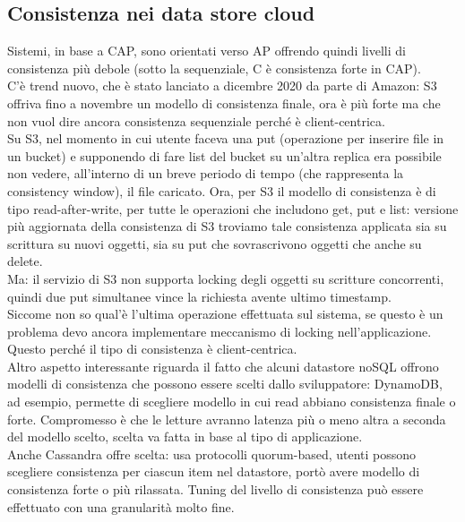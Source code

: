 \documentclass[16px]{article}
\begin{document}
\subsection{Consistenza nei data store cloud}
Sistemi, in base a CAP, sono orientati verso AP offrendo quindi livelli di consistenza più debole (sotto la sequenziale, C è consistenza forte in CAP).\\ C'è trend nuovo, che è stato lanciato a dicembre 2020 da parte di Amazon: S3 offriva fino a novembre un modello di consistenza finale, ora è più forte ma che non vuol dire ancora consistenza sequenziale perché è client-centrica.\\ Su S3, nel momento in cui utente faceva una put (operazione per inserire file in un bucket) e supponendo di fare list del bucket su un'altra replica era possibile non vedere, all'interno di un breve periodo di tempo (che rappresenta la consistency window), il file caricato. Ora, per S3 il modello di consistenza è di tipo read-after-write, per tutte le operazioni che includono get, put e list: versione più aggiornata della consistenza di S3 troviamo tale consistenza applicata sia su scrittura su nuovi oggetti, sia su put che sovrascrivono oggetti che anche su delete.\\ Ma: il servizio di S3 non supporta locking degli oggetti su scritture concorrenti, quindi due put simultanee vince la richiesta avente ultimo timestamp.\\ Siccome non so qual'è l'ultima operazione effettuata sul sistema, se questo è un problema devo ancora implementare meccanismo di locking nell'applicazione. Questo perché il tipo di consistenza è client-centrica.\\ Altro aspetto interessante riguarda il fatto che alcuni datastore noSQL offrono modelli di consistenza che possono essere scelti dallo sviluppatore: DynamoDB, ad esempio, permette di scegliere modello in cui read abbiano consistenza finale o forte. Compromesso è che le letture avranno latenza più o meno altra a seconda del modello scelto, scelta va fatta in base al tipo di applicazione.\\ Anche Cassandra offre scelta: usa protocolli quorum-based, utenti possono scegliere consistenza per ciascun item nel datastore, portò avere modello di consistenza forte o più rilassata. Tuning del livello di consistenza può essere effettuato con una granularità molto fine.
\end{document}
